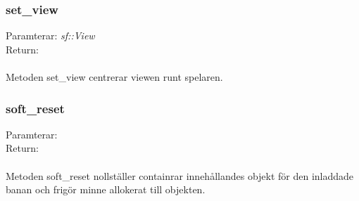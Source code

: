 \documentclass{TDP003mall}
\begin{document}
\subsubsection{set\_view}
Paramterar: \textit{sf::View}
\\Return: \textit{}
\\\\
Metoden set\_view centrerar viewen runt spelaren.

\subsubsection{soft\_reset}
Paramterar: \textit{}
\\Return: \textit{}
\\\\
Metoden soft\_reset nollställer containrar innehållandes objekt för den inladdade banan och frigör minne allokerat till objekten.
\end{document}
